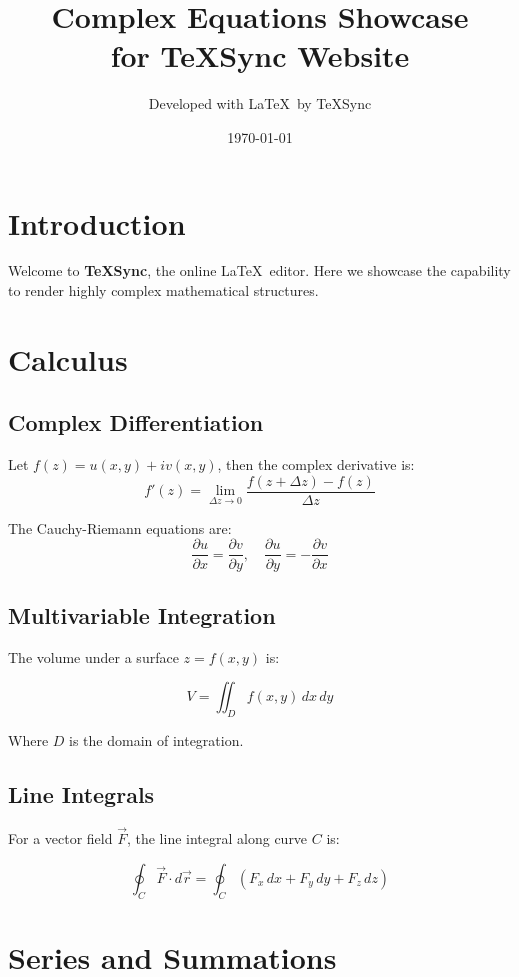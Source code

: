 \documentclass{article}
\title{\textbf{Complex Equations Showcase \\ for TeXSync Website}}
\author{Developed with \LaTeX\ by TeXSync}
\date{\today}
\begin{document}
\maketitle

\tableofcontents
\newpage

\section{Introduction}

Welcome to \textbf{TeXSync}, the online \LaTeX\ editor.  
Here we showcase the capability to render highly complex mathematical structures.

\section{Calculus}

\subsection{Complex Differentiation}

Let \( f(z) = u(x, y) + i v(x, y) \), then the complex derivative is:
\[
f'(z) = \lim_{\Delta z \to 0} \frac{f(z + \Delta z) - f(z)}{\Delta z}
\]

The Cauchy-Riemann equations are:
\[
\frac{\partial u}{\partial x} = \frac{\partial v}{\partial y}, \quad \frac{\partial u}{\partial y} = -\frac{\partial v}{\partial x}
\]

\subsection{Multivariable Integration}

The volume under a surface \( z = f(x,y) \) is:

\[
V = \iint_D f(x,y) \, dx\, dy
\]

Where \( D \) is the domain of integration.

\subsection{Line Integrals}

For a vector field \( \vec{F} \), the line integral along curve \( C \) is:

\[
\oint_C \vec{F} \cdot d\vec{r} = \oint_C \left( F_x \, dx + F_y \, dy + F_z \, dz \right)
\]

\section{Series and Summations}
\end{document}

